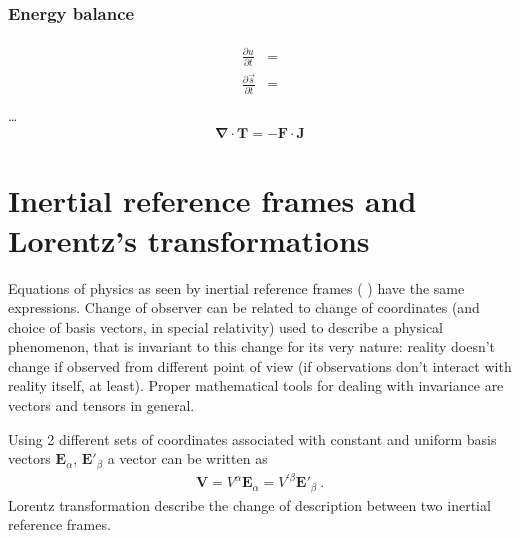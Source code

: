\documentclass[letterpaper,10pt,english]{jupyterBook}
\begin{document}
\subsection{Energy balance}
\label{\detokenize{ch/relativity-special/notes:energy-balance}}\begin{equation*}
\begin{split}\begin{aligned}
  \frac{\partial u      }{\partial t} & = \\
  \frac{\partial \vec{s}}{\partial t} & = \\
\end{aligned}\end{split}
\end{equation*}
\sphinxAtStartPar
…
\begin{equation*}
\begin{split}\symbf{\nabla} \cdot \mathbf{T} = - \mathbf{F} \cdot \mathbf{J}\end{split}
\end{equation*}
\sphinxstepscope


\chapter{Inertial reference frames and Lorentz’s transformations}
\label{\detokenize{ch/relativity-special/lorentz:inertial-reference-frames-and-lorentz-s-transformations}}\label{\detokenize{ch/relativity-special/lorentz:relativity-special-lorentz}}\label{\detokenize{ch/relativity-special/lorentz::doc}}
\sphinxAtStartPar
Equations of physics as seen by inertial reference frames ( ) have the same expressions. Change of observer can be related to change of coordinates (and choice of basis vectors, in special relativity) used to describe a physical phenomenon, that is invariant to this change for its very nature: reality doesn’t change if observed from different point of view (if observations don’t interact with reality itself, at least). Proper mathematical tools for dealing with invariance are vectors and tensors in general.

\sphinxAtStartPar
Using 2 different sets of coordinates associated with constant and uniform basis vectors \(\mathbf{E}_{\alpha}\), \(\mathbf{E}'_{\beta}\) a vector can be written as
\begin{equation*}
\begin{split}\mathbf{V} = V^{\alpha} \mathbf{E}_{\alpha} = V^{'\beta} \mathbf{E}'_{\beta} \ . \end{split}
\end{equation*}
\sphinxAtStartPar
Lorentz transformation describe the change of description between two inertial reference frames.
\end{document}
